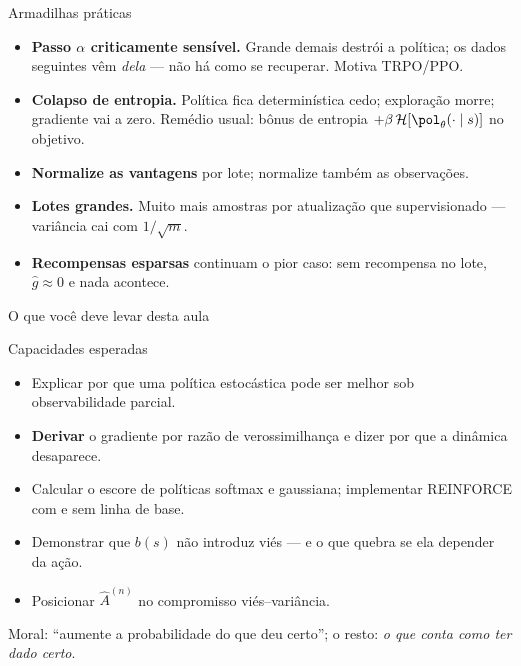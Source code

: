 \documentclass[aspectratio=169, 11pt]{beamer}
\newcommand{\thv}{\theta}                       %
\newcommand{\polth}{\pol_{\thv}}                %
\newcommand{\Ahat}{\hat{A}}
\begin{document}
\begin{frame}{Armadilhas práticas}

  \begin{itemize}\setlength{\itemsep}{0.45ex}
    \item \textbf{Passo $\alpha$ criticamente sensível.} Grande demais destrói
      a política; os dados seguintes vêm \emph{dela} --- não há como se
      recuperar. Motiva TRPO/PPO.
    \item \textbf{Colapso de entropia.} Política fica determinística cedo;
      exploração morre; gradiente vai a zero. Remédio usual: bônus de entropia
      $+\beta\,\mathcal{H}[\polth(\cdot\mid s)]$ no objetivo.
    \item \textbf{Normalize as vantagens} por lote; normalize também as
      observações.
    \item \textbf{Lotes grandes.} Muito mais amostras por atualização que
      supervisionado --- variância cai com $1/\sqrt{m}$.
    \item \textbf{Recompensas esparsas} continuam o pior caso: sem recompensa
      no lote, $\hat g \approx 0$ e nada acontece.
  \end{itemize}
\end{frame}

\begin{frame}{O que você deve levar desta aula}

  \begin{defbox}{Capacidades esperadas}
    \begin{itemize}\setlength{\itemsep}{0.25ex}
      \item Explicar por que uma política estocástica pode ser melhor sob
        observabilidade parcial.
      \item \textbf{Derivar} o gradiente por razão de verossimilhança e dizer
        por que a dinâmica desaparece.
      \item Calcular o escore de políticas softmax e gaussiana; implementar
        REINFORCE com e sem linha de base.
      \item Demonstrar que $b(s)$ não introduz viés --- e o que quebra se ela
        depender da ação.
      \item Posicionar $\Ahat^{(n)}$ no compromisso viés--variância.
    \end{itemize}
  \end{defbox}

  \vspace{-0.9em}
  \begin{ideiabox}
    Moral: ``aumente a probabilidade do que deu certo''; o resto: \emph{o que
    conta como ter dado certo}.
  \end{ideiabox}
\end{frame}
\end{document}
